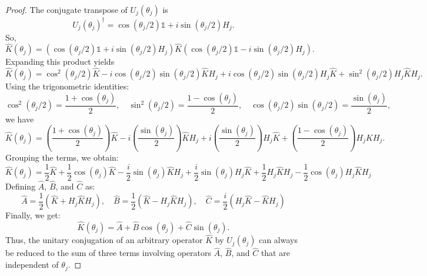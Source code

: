 \begin{proof}
 The conjugate transpose of $U_j(\theta_j)$ is 
\begin{equation}
    U_j(\theta_j)^{\dagger} = \cos \left(\theta_j / 2\right) \mathbb{1} + i \sin \left(\theta_j / 2\right) H_j.
\end{equation}
So,
\begin{equation}
    \hat{K}(\theta_j) = \left( \cos \left(\theta_j / 2\right) \mathbb{1} + i \sin \left(\theta_j / 2\right) H_j \right) \hat{K} \left( \cos \left(\theta_j / 2\right) \mathbb{1} - i \sin \left(\theta_j / 2\right) H_j \right).
\end{equation}
Expanding this product yields
\begin{equation}
    \hat{K}(\theta_j) = \cos^2 \left(\theta_j / 2\right) \hat{K} - i \cos \left(\theta_j / 2\right) \sin \left(\theta_j / 2\right) \hat{K} H_j + i \cos \left(\theta_j / 2\right) \sin \left(\theta_j / 2\right) H_j \hat{K} + \sin^2 \left(\theta_j / 2\right) H_j \hat{K} H_j.
\end{equation}
Using the trigonometric identities:
\begin{equation}
    \cos^2 \left(\theta_j / 2\right) = \frac{1 + \cos(\theta_j)}{2}, \quad \sin^2 \left(\theta_j / 2\right) = \frac{1 - \cos(\theta_j)}{2}, \quad \cos \left(\theta_j / 2\right) \sin \left(\theta_j / 2\right) = \frac{\sin(\theta_j)}{2},
\end{equation}
we have
\begin{equation}
    \hat{K}(\theta_j) = \left( \frac{1 + \cos(\theta_j)}{2} \right) \hat{K} - i \left( \frac{\sin(\theta_j)}{2} \right) \hat{K} H_j + i \left( \frac{\sin(\theta_j)}{2} \right) H_j \hat{K} + \left( \frac{1 - \cos(\theta_j)}{2} \right) H_j \hat{K} H_j.
\end{equation}
Grouping the terms, we obtain:
\begin{equation}
    \hat{K}(\theta_j) = \frac{1}{2} \hat{K} + \frac{1}{2} \cos(\theta_j) \hat{K} - \frac{i}{2} \sin(\theta_j) \hat{K} H_j + \frac{i}{2} \sin(\theta_j) H_j \hat{K} + \frac{1}{2} H_j \hat{K} H_j - \frac{1}{2} \cos(\theta_j) H_j \hat{K} H_j
\end{equation}
Defining $\hat{A}$, $\hat{B}$, and $\hat{C}$ as:
\begin{equation}
    \hat{A} = \frac{1}{2} (\hat{K} + H_j \hat{K} H_j), \quad \hat{B} = \frac{1}{2} (\hat{K} - H_j \hat{K} H_j), \quad \hat{C} = \frac{i}{2} (H_j \hat{K} - \hat{K} H_j)
\end{equation}
Finally, we get:
\begin{equation}
    \hat{K}(\theta_j) = \hat{A} + \hat{B} \cos(\theta_j) + \hat{C} \sin(\theta_j).
\end{equation}
Thus, the unitary conjugation of an arbitrary operator $\hat{K}$ by $U_j(\theta_j)$ can always be reduced to the sum of three terms involving operators $\hat{A}$, $\hat{B}$, and $\hat{C}$ that are independent of $\theta_j$.
\end{proof}

